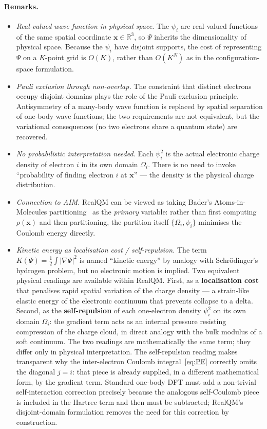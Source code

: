 \documentclass[11pt]{article}
\begin{document}
\paragraph{Remarks.}
\begin{itemize}\setlength{\itemsep}{2pt}
\item \emph{Real-valued wave function in physical space.} The $\psi_i$ are real-valued functions of the same spatial coordinate $\mathbf{x} \in \mathbb{R}^3$, so $\Psi$ inherits the dimensionality of physical space. Because the $\psi_i$ have disjoint supports, the cost of representing $\Psi$ on a $K$-point grid is $O(K)$, rather than $O(K^N)$ as in the configuration-space formulation.
\item \emph{Pauli exclusion through non-overlap.} The constraint that distinct electrons occupy disjoint domains plays the role of the Pauli exclusion principle. Antisymmetry of a many-body wave function is replaced by spatial separation of one-body wave functions; the two requirements are not equivalent, but the variational consequences (no two electrons share a quantum state) are recovered.
\item \emph{No probabilistic interpretation needed.} Each $\psi_i^2$ is the actual electronic charge density of electron $i$ in its own domain $\Omega_i$. There is no need to invoke ``probability of finding electron $i$ at $\mathbf{x}$'' --- the density is the physical charge distribution.
\item \emph{Connection to AIM.} RealQM can be viewed as taking Bader's Atoms-in-Molecules partitioning~\cite{Bader90} as the \emph{primary} variable: rather than first computing $\rho(\mathbf{x})$ and then partitioning, the partition itself $\{\Omega_i, \psi_i\}$ minimises the Coulomb energy directly.
\item \emph{Kinetic energy as localisation cost / self-repulsion.} The term $K(\Psi) = \tfrac{1}{2}\int |\nabla \Psi|^2$ is named ``kinetic energy'' by analogy with Schr\"odinger's hydrogen problem, but no electronic motion is implied. Two equivalent physical readings are available within RealQM. First, as a \textbf{localisation cost} that penalises rapid spatial variation of the charge density --- a strain-like elastic energy of the electronic continuum that prevents collapse to a delta. Second, as the \textbf{self-repulsion} of each one-electron density $\psi_i^2$ on its own domain $\Omega_i$: the gradient term acts as an internal pressure resisting compression of the charge cloud, in direct analogy with the bulk modulus of a soft continuum. The two readings are mathematically the same term; they differ only in physical interpretation. The self-repulsion reading makes transparent why the inter-electron Coulomb integral~\eqref{eq:PE} correctly omits the diagonal $j = i$: that piece is already supplied, in a different mathematical form, by the gradient term. Standard one-body DFT must add a non-trivial self-interaction correction precisely because the analogous self-Coulomb piece is included in the Hartree term and then must be subtracted; RealQM's disjoint-domain formulation removes the need for this correction by construction.
\end{itemize}
\end{document}
